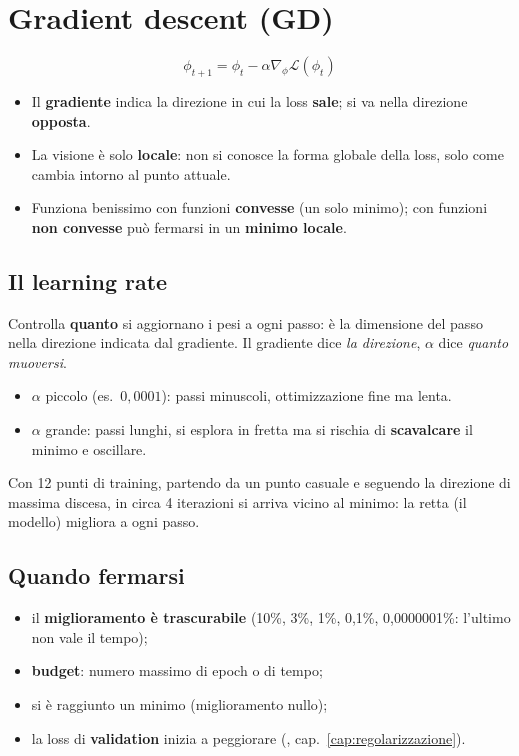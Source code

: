 \section{Gradient descent (GD)}
\[
\phi_{t+1} = \phi_t - \alpha \nabla_\phi \mathcal{L}(\phi_t)
\]
\begin{itemize}
  \item Il \textbf{gradiente} indica la direzione in cui la loss \textbf{sale}; si va nella direzione \textbf{opposta}.
  \item La visione è solo \textbf{locale}: non si conosce la forma globale della loss, solo come cambia intorno al punto attuale.
  \item Funziona benissimo con funzioni \textbf{convesse} (un solo minimo); con funzioni \textbf{non convesse} può fermarsi in un
        \textbf{minimo locale}.
\end{itemize}

\subsection{Il learning rate}
\begin{definizione}
Controlla \textbf{quanto} si aggiornano i pesi a ogni passo: è la dimensione del passo nella direzione indicata dal
gradiente. Il gradiente dice \emph{la direzione}, $\alpha$ dice \emph{quanto muoversi}.
\end{definizione}
\begin{itemize}
  \item $\alpha$ piccolo (es.\ $0{,}0001$): passi minuscoli, ottimizzazione fine ma lenta.
  \item $\alpha$ grande: passi lunghi, si esplora in fretta ma si rischia di \textbf{scavalcare} il minimo e oscillare.
\end{itemize}


\begin{esempio}[regressione lineare $y = x\phi_1 + \phi_0$]
Con 12 punti di training, partendo da un punto casuale e seguendo la direzione di massima discesa, in circa 4 iterazioni si
arriva vicino al minimo: la retta (il modello) migliora a ogni passo.
\end{esempio}

\subsection{Quando fermarsi}
\begin{itemize}
  \item il \textbf{miglioramento è trascurabile} (10\%, 3\%, 1\%, 0,1\%, 0,0000001\%: l'ultimo non vale il tempo);
  \item \textbf{budget}: numero massimo di epoch o di tempo;
  \item si è raggiunto un minimo (miglioramento nullo);
  \item la loss di \textbf{validation} inizia a peggiorare (, cap.~\ref{cap:regolarizzazione}).
\end{itemize}

